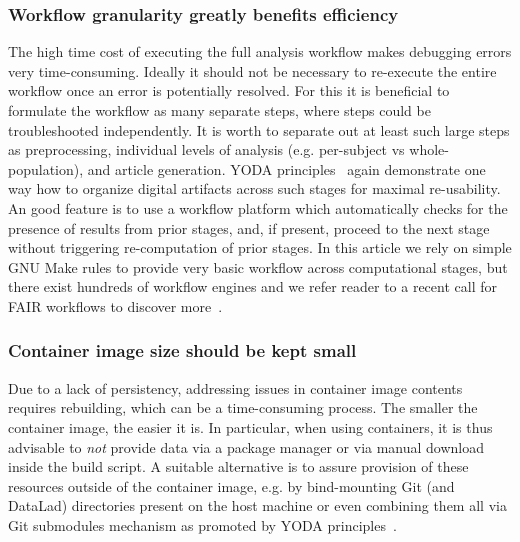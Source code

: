 \subsubsection{Workflow granularity greatly benefits efficiency}
The high time cost of executing the full analysis workflow makes debugging errors very time-consuming.
Ideally it should not be necessary to re-execute the entire workflow once an error is potentially resolved.
For this it is beneficial to formulate the workflow as many separate steps, where steps could be troubleshooted independently.
It is worth to separate out at least such large steps as preprocessing, individual levels of analysis (e.g. per-subject vs whole-population), and article generation.
YODA principles~\cite{yoda} again demonstrate one way how to organize digital artifacts across such stages for maximal re-usability.
An good feature is to use a workflow platform which automatically checks for the presence of results from prior stages, and, if present, proceed to the next stage without triggering re-computation of prior stages.
In this article we rely on simple GNU Make rules to provide very basic workflow across computational stages, but there exist hundreds of workflow engines and we refer reader to a recent call for FAIR workflows to discover more~\cite{fair-workflows}.

\subsubsection{Container image size should be kept small}
Due to a lack of persistency, addressing issues in container image contents requires rebuilding, which can be a time-consuming process.
The smaller the container image, the easier it is.
In particular, when using containers, it is thus advisable to \textit{not} provide data via a package manager or via manual download inside the build script.
A suitable alternative is to assure provision of these resources outside of the container image, e.g. by bind-mounting Git (and DataLad) directories present on the host machine or even combining them all via Git submodules mechanism as promoted by YODA principles~\cite{yoda}.

